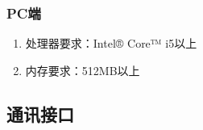\subsubsection{PC端}
	\begin{enumerate}
		\item 处理器要求：Intel® Core™ i5以上
		\item 内存要求：512MB以上 
	\end{enumerate}
\subsection{通讯接口}

